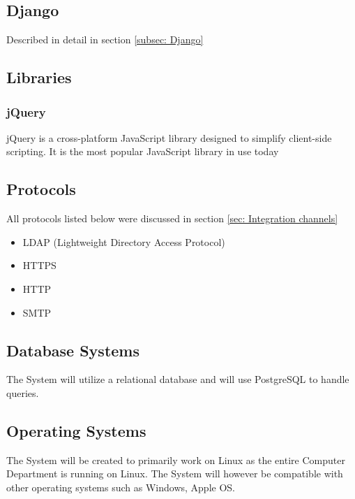 \documentclass{article}
\begin{document}
		\subsection{Django}
			Described in detail in section \ref{subsec: Django}
			
	\subsection{Libraries}
			\subsubsection{jQuery}
			jQuery is a cross-platform JavaScript library designed to simplify client-side scripting. It is the most popular JavaScript library in use today
	
	\subsection{Protocols}
		All protocols listed below were discussed in section \ref{sec: Integration channels}
			\begin{itemize}
				\item LDAP (Lightweight Directory Access Protocol)
				\item HTTPS
				\item HTTP
				\item SMTP	
			\end{itemize}
	
	\subsection{Database Systems}
		The System will utilize a relational database and will use PostgreSQL to handle queries.
		
	\subsection{Operating Systems}
		The System will be created to primarily work on Linux as the entire Computer Department is running on Linux. The System will however be compatible with other operating systems such as Windows, Apple OS.
\end{document}
